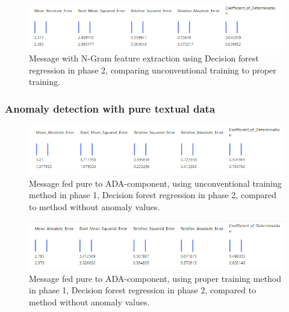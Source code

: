 \begin{figure}[htb]
    \centering
    \includegraphics[width=150mm]{./appendices/msg_ngram_decision-forest-reg_lewd2proper.png}
    \caption{Message with N-Gram feature extraction
    using Decision forest regression in phase 2,
        comparing unconventional training to proper training.
        \label{fig:msg_ngram_decision-forest-reg_lewd2proper}}
\end{figure}



\clearpage


\subsubsection*{Anomaly detection with pure textual data}

\begin{figure}[htb]
    \centering
    \includegraphics[width=150mm]{./appendices/msg_pure_decision-forest-reg_lewd2unanom.png}
    \caption{Message fed pure to ADA-component,
    using unconventional training method in phase 1,
        Decision forest regression in phase 2,
        compared to method without anomaly values.
        \label{fig:msg_pure_decision-forest-reg_lewd2unanom}}
\end{figure}

\begin{figure}[htb]
    \centering
    \includegraphics[width=150mm]{./appendices/msg_pure_decision-forest-reg_proper2unanom.png}
    \caption{Message fed pure to ADA-component,
        using proper training method in phase 1,
        Decision forest regression in phase 2,
        compared to method without anomaly values.
        \label{fig:msg_pure_decision-forest-reg_proper2unanom}}
\end{figure}



